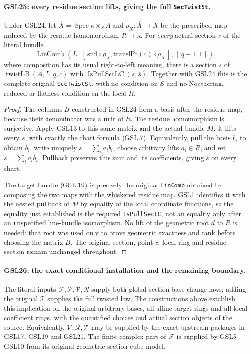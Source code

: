 \paragraph{GSL25: every residue section lifts, giving the full \texttt{SecTwistSt}.}
\label{claim:GSL25}
Under GSL24, let $\overline X=\operatorname{Spec}\kappa\times_S A$
and $\rho_X:\overline X\to X$ be the prescribed map induced by
the residue homomorphism $R\to\kappa$.  For \emph{every} actual
section $\overline s$ of the literal bundle
\[
 \operatorname{LinComb}\!\left(
   L,\ [\,\mathrm{snd}\circ\rho_X,
              \mathrm{translPt}(c)\circ\rho_X\,],\
          [\,q-1,1\,]\right),
 \tag{GSL.19}
\]
where composition has its usual right-to-left meaning,
there is a section $s$ of
$\operatorname{twistLB}(A,L,q,c)$ with
$\operatorname{IsPullSecLC}(s,\overline s)$.
Together with GSL24 this is the complete original
\texttt{SecTwistSt}, with no condition on $S$ and no
Noetherian, reduced or flatness condition on the local $R$.

\begin{proof}
The columns $B$ constructed in GSL24 form a basis after the
residue map, because their denominator was a unit of $R$.
The residue homomorphism is surjective.  Apply GSL13 to
this same matrix and the actual bundle $M$.  It lifts every
$\overline s$, with exactly the chart formula (GSL.7).
Equivalently, pull the basis $b_i$ to obtain $\overline b_i$,
write uniquely $\overline s=\sum_i\overline a_i\overline b_i$,
choose arbitrary lifts $a_i\in R$, and set $s=\sum_i a_i b_i$.
Pullback preserves this sum and its coefficients, giving
$\overline s$ on every chart.

The target bundle (GSL.19) is precisely the original
\texttt{LinComb} obtained by composing the two maps with the
whiskered residue map.  GSL1 identifies it with the nested
pullback of $M$ by equality of the local coordinate functions,
so the equality just established is the required
\texttt{IsPullSecLC}, not an equality only after an unspecified
line-bundle isomorphism.  No lift of the geometric root $d$
to $R$ is needed: that root was used only to prove geometric
exactness and rank before choosing the matrix $B$.
The original section, point $c$, local ring and residue
section remain unchanged throughout.
\end{proof}

\paragraph{GSL26: the exact conditional installation and the remaining boundary.}
\label{claim:GSL26}
The literal inputs $\mathcal F,\mathcal P,\mathcal V,\mathcal R$
supply both global section base-change laws; adding the original
$\mathcal T$ supplies the full twisted law.  The constructions
above establish this implication on the original arbitrary bases,
all affine target rings and all local coefficient rings, with
the quantified choices and actual section objects of the source.
Equivalently, $\mathcal V,\mathcal R,\mathcal T$ may be supplied
by the exact upstream packages in GSL17, GSL19 and GSL21.
The finite-complex part of $\mathcal F$ is supplied by
GSL5--GSL10 from its original geometric section-cube model.


